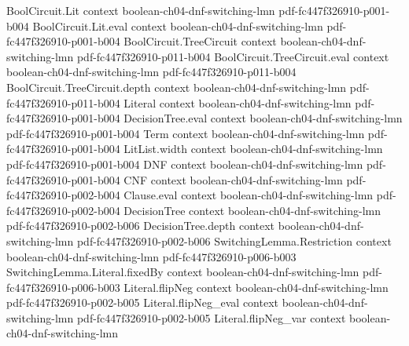 \begin{lemma}
\label{LMN.absorbOneLevel}
\leanok
{}
\proofstep
  {BoolCircuit.Lit}
  {context}
  {boolean-ch04-dnf-switching-lmn}
  {pdf-fc447f326910-p001-b004}
\proofstep
  {BoolCircuit.Lit.eval}
  {context}
  {boolean-ch04-dnf-switching-lmn}
  {pdf-fc447f326910-p001-b004}
\proofstep
  {BoolCircuit.TreeCircuit}
  {context}
  {boolean-ch04-dnf-switching-lmn}
  {pdf-fc447f326910-p011-b004}
\proofstep
  {BoolCircuit.TreeCircuit.eval}
  {context}
  {boolean-ch04-dnf-switching-lmn}
  {pdf-fc447f326910-p011-b004}
\proofstep
  {BoolCircuit.TreeCircuit.depth}
  {context}
  {boolean-ch04-dnf-switching-lmn}
  {pdf-fc447f326910-p011-b004}
\proofstep
  {Literal}
  {context}
  {boolean-ch04-dnf-switching-lmn}
  {pdf-fc447f326910-p001-b004}
\proofstep
  {DecisionTree.eval}
  {context}
  {boolean-ch04-dnf-switching-lmn}
  {pdf-fc447f326910-p001-b004}
\proofstep
  {Term}
  {context}
  {boolean-ch04-dnf-switching-lmn}
  {pdf-fc447f326910-p001-b004}
\proofstep
  {LitList.width}
  {context}
  {boolean-ch04-dnf-switching-lmn}
  {pdf-fc447f326910-p001-b004}
\proofstep
  {DNF}
  {context}
  {boolean-ch04-dnf-switching-lmn}
  {pdf-fc447f326910-p001-b004}
\proofstep
  {CNF}
  {context}
  {boolean-ch04-dnf-switching-lmn}
  {pdf-fc447f326910-p002-b004}
\proofstep
  {Clause.eval}
  {context}
  {boolean-ch04-dnf-switching-lmn}
  {pdf-fc447f326910-p002-b004}
\proofstep
  {DecisionTree}
  {context}
  {boolean-ch04-dnf-switching-lmn}
  {pdf-fc447f326910-p002-b006}
\proofstep
  {DecisionTree.depth}
  {context}
  {boolean-ch04-dnf-switching-lmn}
  {pdf-fc447f326910-p002-b006}
\proofstep
  {SwitchingLemma.Restriction}
  {context}
  {boolean-ch04-dnf-switching-lmn}
  {pdf-fc447f326910-p006-b003}
\proofstep
  {SwitchingLemma.Literal.fixedBy}
  {context}
  {boolean-ch04-dnf-switching-lmn}
  {pdf-fc447f326910-p006-b003}
\proofstep
  {Literal.flipNeg}
  {context}
  {boolean-ch04-dnf-switching-lmn}
  {pdf-fc447f326910-p002-b005}
\proofstep
  {Literal.flipNeg_eval}
  {context}
  {boolean-ch04-dnf-switching-lmn}
  {pdf-fc447f326910-p002-b005}
\proofstep
  {Literal.flipNeg_var}
  {context}
  {boolean-ch04-dnf-switching-lmn}

\end{lemma}
